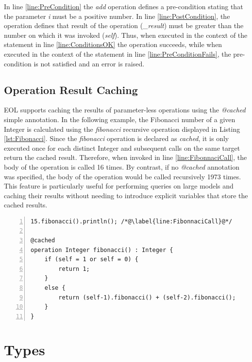 In line \ref{line:PreCondition} the \emph{add} operation defines a pre-condition stating that the parameter \emph{i} must be a positive number. In line \ref{line:PostCondition}, the operation defines that result of the operation (\emph{\_result}) must be greater than the number on which it was invoked (\emph{self}). Thus, when executed in the context of the statement in line \ref{line:ConditionsOK} the operation succeeds, while when executed in the context of the statement in line \ref{line:PreConditionFails}, the pre-condition is not satisfied and an error is raised. 

\subsection{Operation Result Caching}
\label{sec:EolCaching}

EOL supports caching the results of parameter-less operations using the \emph{@cached} simple annotation. In the following example, the Fibonacci number of a given Integer is calculated using the \emph{fibonacci} recursive operation displayed in Listing \ref{lst:Fibonacci}. Since the \emph{fibonacci} operation is declared as \emph{cached}, it is only executed once for each distinct Integer and subsequent calls on the same target return the cached result. Therefore, when invoked in line \ref{line:FibonnaciCall}, the body of the operation is called 16 times. By contrast, if no \emph{@cached} annotation was specified, the body of the operation would be called recursively 1973 times. This feature is particularly useful for performing queries on large models and caching their results without needing to introduce explicit variables that store the cached results.

\begin{lstlisting}[basicstyle=\ttfamily\footnotesize, flexiblecolumns=true, numbers=left, nolol=true, caption=Calculating the Fibonacci number using a cached operation, label=lst:Fibonacci, language=EOL, tabsize=2]
15.fibonacci().println(); /*@\label{line:FibonnaciCall}@*/

@cached
operation Integer fibonacci() : Integer {
	if (self = 1 or self = 0) {
		return 1;
	}
	else {
		return (self-1).fibonacci() + (self-2).fibonacci();
	}
}
\end{lstlisting}

\section{Types}

